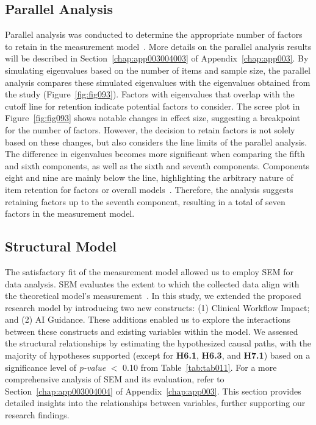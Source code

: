 \subsection{Parallel Analysis}
\label{sec:chap004005003}

Parallel analysis was conducted to determine the appropriate number of factors to retain in the measurement model~\cite{doi:10.1080/10705511.2019.1615835}.
More details on the parallel analysis results will be described in Section~\ref{chap:app003004003} of Appendix~\ref{chap:app003}.
By simulating eigenvalues based on the number of items and sample size, the parallel analysis compares these simulated eigenvalues with the eigenvalues obtained from the study (Figure~\ref{fig:fig093}).
Factors with eigenvalues that overlap with the cutoff line for retention indicate potential factors to consider.
The scree plot in Figure~\ref{fig:fig093} shows notable changes in effect size, suggesting a breakpoint for the number of factors.
However, the decision to retain factors is not solely based on these changes, but also considers the line limits of the parallel analysis.
The difference in eigenvalues becomes more significant when comparing the fifth and sixth components, as well as the sixth and seventh components.
Components eight and nine are mainly below the line, highlighting the arbitrary nature of item retention for factors or overall models~\cite{doi:10.1207/S15328031US0201}.
Therefore, the analysis suggests retaining factors up to the seventh component, resulting in a total of seven factors in the measurement model.

\subsection{Structural Model}
\label{sec:chap004005004}

The satisfactory fit of the measurement model allowed us to employ \ac{SEM} for data analysis.
\ac{SEM} evaluates the extent to which the collected data align with the theoretical model's measurement~\cite{doi:10.1080/10705511.2017.1401932}.
In this study, we extended the proposed research model by introducing two new constructs:
(1) Clinical Workflow Impact; and
(2) \ac{AI} Guidance.
These additions enabled us to explore the interactions between these constructs and existing variables within the model.
We assessed the structural relationships by estimating the hypothesized causal paths, with the majority of hypotheses supported (except for {\bf H6.1}, {\bf H6.3}, and {\bf H7.1}) based on a significance level of {\it p-value} $<$ 0.10 from Table~\ref{tab:tab011}.
For a more comprehensive analysis of \ac{SEM} and its evaluation, refer to Section~\ref{chap:app003004004} of Appendix~\ref{chap:app003}.
This section provides detailed insights into the relationships between variables, further supporting our research findings.

